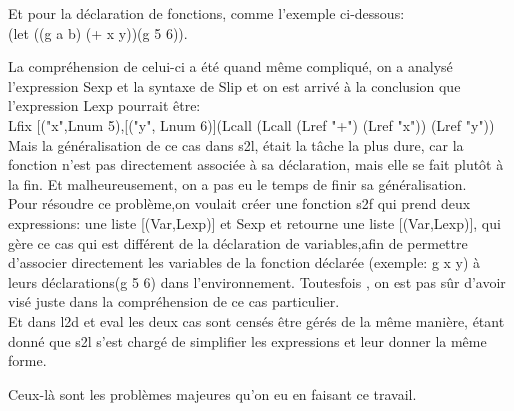 \documentclass{article}
\begin{document}
\begin{enumerate}
    Et pour la déclaration de fonctions, comme l'exemple ci-dessous:\\
    (let ((g a b) (+ x y))(g 5 6)).
    
    La compréhension de celui-ci a été quand même compliqué, on a analysé l'expression Sexp et la syntaxe de Slip et on est arrivé à la conclusion que l'expression Lexp pourrait être:\\
    Lfix [("x",Lnum 5),[("y", Lnum 6)](Lcall (Lcall (Lref "+") (Lref "x")) (Lref "y"))
    \\
    
    Mais la généralisation de ce cas dans s2l, était la tâche la plus dure, car la fonction n'est pas directement associée à sa déclaration, mais elle se fait plutôt à la fin.
    Et malheureusement, on a pas eu le temps de finir sa généralisation.
    \\
    Pour résoudre ce problème,on voulait créer une fonction s2f qui prend deux expressions: une liste [(Var,Lexp)] et Sexp et retourne une liste [(Var,Lexp)], qui gère ce cas qui est différent de la déclaration de variables,afin de  permettre d'associer directement les variables de la fonction déclarée (exemple: g x y)  à leurs déclarations(g 5 6) dans l'environnement. Toutesfois , on est pas sûr d'avoir visé juste dans la compréhension de ce cas particulier. \\
    
    Et dans l2d et eval les deux cas sont censés être  gérés de la même manière, étant donné que s2l s'est chargé de simplifier les expressions et leur donner la même forme.
    
\end{enumerate}
Ceux-là sont les problèmes majeures qu'on eu en faisant ce travail.
\end{document}

